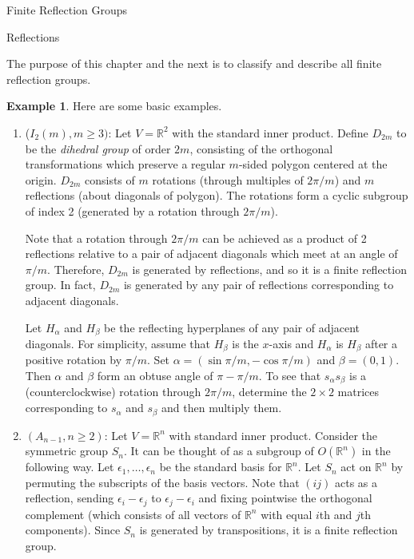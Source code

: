 \documentclass[12pt]{nauthesis}
\theoremstyle{definition}
\newtheorem{example}[theorem]{Example}
\newcommand{\R}{\mathbb{R}}
\renewcommand{\(}{\big(}
\renewcommand{\)}{\big)}
\begin{document}
\begin{flushleft}
\begin{chapter}{Finite Reflection Groups}
\begin{section}{Reflections}
\medskip

The purpose of this chapter and the next is to classify and describe all finite reflection groups. 

\medskip

\begin{example}
Here are some basic examples.
\begin{enumerate}
\item[] ($I_2(m), m \geq 3)$:  Let $V=\R^2$ with the standard inner product.  Define $D_{2m}$ to be the {\it dihedral group} of order $2m$, consisting of the orthogonal transformations which preserve a regular $m$-sided polygon centered at the origin.  $D_{2m}$ consists of $m$ rotations (through multiples of $2\pi/m$) and $m$ reflections (about diagonals of polygon).   The rotations form a cyclic subgroup of index 2 (generated by a rotation through $2\pi/m$).

\medskip

Note that a rotation through $2\pi/m$ can be achieved as a product of 2 reflections relative to a pair of adjacent diagonals which meet at an angle of $\pi/m$.  Therefore, $D_{2m}$ is generated by reflections, and so it is a finite reflection group.  In fact, $D_{2m}$ is generated by any pair of reflections corresponding to adjacent diagonals.

\medskip

Let $H_\alpha$ and $H_\beta$ be the reflecting hyperplanes of any pair of adjacent diagonals.  For simplicity, assume that $H_\beta$ is the $x$-axis and $H_\alpha$ is $H_\beta$ after a positive rotation by $\pi/m$. Set $\alpha=(\sin\pi/m,-\cos\pi/m)$ and $\beta=(0,1)$.  Then $\alpha$ and $\beta$ form an obtuse angle of $\pi-\pi/m$.  To see that $s_\alpha s_\beta $ is a (counterclockwise) rotation through $2\pi/m$, determine the $2 \times 2$ matrices corresponding to $s_\alpha$ and $s_\beta$ and then multiply them.

\item[] $(A_{n-1}, n\geq 2)$:  Let $V=\R^n$ with standard inner product.  Consider the symmetric group $S_n$.  It can be thought of as a subgroup of $O(\R^n)$ in the following way.  Let $ \epsilon_1, \ldots, \epsilon_n$ be the standard basis for $\R^n$.  Let $S_n$ act on $\R^n$ by permuting the subscripts of the basis vectors.  Note that $(ij)$ acts as a reflection, sending $\epsilon_i-\epsilon_j$ to $\epsilon_j-\epsilon_i$ and fixing pointwise the orthogonal complement (which consists of all vectors of $\R^n$ with equal $i$th and $j$th components).  Since $S_n$ is generated by transpositions, it is a finite reflection group.


\end{enumerate}
\end{example}
\end{section}
\end{chapter}
\end{flushleft}
\end{document}
